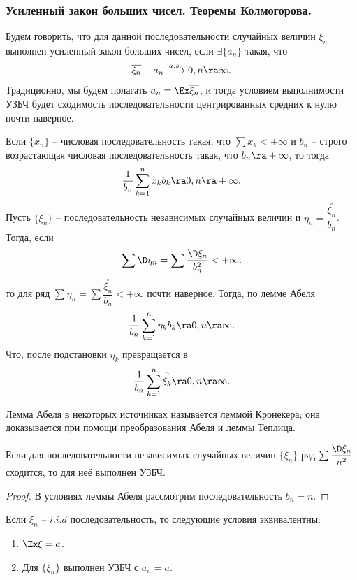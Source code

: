 \subsubsection{Усиленный закон больших чисел. Теоремы Колмогорова.}
Будем говорить, что для данной последовательности случайных величин $\xi_n$ выполнен усиленный закон больших чисел, если $\exists \{a_n\}$ такая, что
\[
    \overline{\xi_n} - a_n \xrightarrow{a.s.} 0, n \ra \infty.
\]
Традиционно, мы будем полагать $a_n = \Ex \overline{\xi_n}$, и тогда условием выполнимости УЗБЧ будет сходимость последовательности центрированных средних к нулю почти наверное.
\begin{reminder}
    Если $\{x_n\}$ -- числовая последовательность такая, что $\sum x_k < +\infty$ и $b_n$ -- строго возрастающая числовая последовательность такая, что $b_n \ra +\infty$, то тогда
    \[
        \dfrac{1}{b_n} \sum\limits_{k = 1}^{n} x_k b_k \ra 0, n \ra +\infty.
    \]
    Пусть $\{\xi_n\}$ -- последовательность независимых случайных величин и $\eta_n = \dfrac{\overset{\circ}{\xi_n}}{b_n}$.
    Тогда, если
    \[
        \sum \D \eta_n = \sum \dfrac{\D \xi_n}{b_n^2} < +\infty.
    \]
    то для ряд $\sum \eta_n = \sum \dfrac{\overset{\circ}{\xi_n}}{b_n} < +\infty$ почти наверное.
    Тогда, по лемме Абеля
    \[
        \dfrac{1}{b_n} \sum\limits_{k = 1}^{n} \eta_k b_k \ra 0, n \ra \infty.
    \]
    Что, после подстановки $\eta_k$ превращается в
    \[
        \dfrac{1}{b_n} \sum\limits_{k = 1}^{n} \overset{\circ}{\xi_k} \ra 0, n \ra \infty.
    \]
\end{reminder}
\begin{note}
    Лемма Абеля в некоторых источниках называется леммой Кронекера; она доказывается при помощи преобразования Абеля и леммы Теплица.
\end{note}
\begin{theorem}
    Если для последовательности независимых случайных величин $\{\xi_n\}$ ряд $\sum \dfrac{\D \xi_n}{n^2}$ сходится, то для неё выполнен УЗБЧ.
\end{theorem}
\begin{proof}
    В условиях леммы Абеля рассмотрим последовательность $b_n = n$.
\end{proof}
\begin{theorem}
    Если $\xi_n$ -- $i.i.d$ последовательность, то следующие условия эквивалентны:
    \begin{enumerate}
        \item $\Ex \xi = a$.
        \item Для $\{\xi_n\}$ выполнен УЗБЧ с $a_n = a$.
    \end{enumerate}
\end{theorem}
